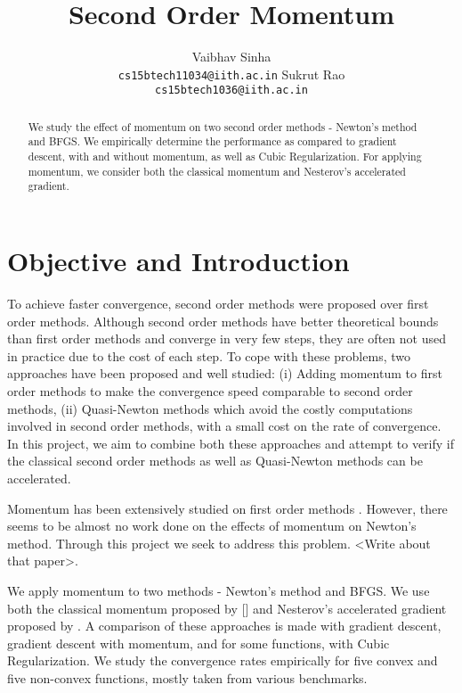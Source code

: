 \documentclass{article}
\title{Second Order Momentum}
\author{
  Vaibhav Sinha \\
  \texttt{cs15btech11034@iith.ac.in}
  \And
  Sukrut Rao \\
  \texttt{cs15btech1036@iith.ac.in}
}
\begin{document}
\maketitle

\begin{abstract}
  We study the effect of momentum on two second order methods - Newton's method and BFGS. We empirically determine the performance as compared to gradient descent, with and without momentum, as well as Cubic Regularization. For applying momentum, we consider both the classical momentum and Nesterov's accelerated gradient.
\end{abstract}

\section{Objective and Introduction}\label{introduction}

To achieve faster convergence, second order methods were proposed over first order methods. Although second order methods have better theoretical bounds than first order methods and converge in very few steps, they are often not used in practice due to the cost of each step. To cope with these problems, two approaches have been proposed and well studied: (i) Adding momentum \cite{POLYAK19641,Sutskever} to first order methods to make the convergence speed comparable to second order methods, (ii) Quasi-Newton methods \citep{davidon,broyden1965class,nocedal1980updating} which avoid the costly computations involved in second order methods, with a small cost on the rate of convergence. In this project, we aim to combine both these approaches and attempt to verify if the classical second order methods as well as Quasi-Newton methods can be accelerated.

Momentum has been extensively studied on first order methods \citep{POLYAK19641,Sutskever}. However, there seems to be almost no work done on the effects of momentum on Newton’s method. Through this project we seek to address this problem. <Write about that paper>.

We apply momentum to two methods - Newton's method and BFGS. We use both the classical momentum proposed by [] and Nesterov's accelerated gradient proposed by \citet{Sutskever}. A comparison of these approaches is made with gradient descent, gradient descent with momentum, and for some functions, with Cubic Regularization. We study the convergence rates empirically for five convex and five non-convex functions, mostly taken from various benchmarks.
\end{document}

